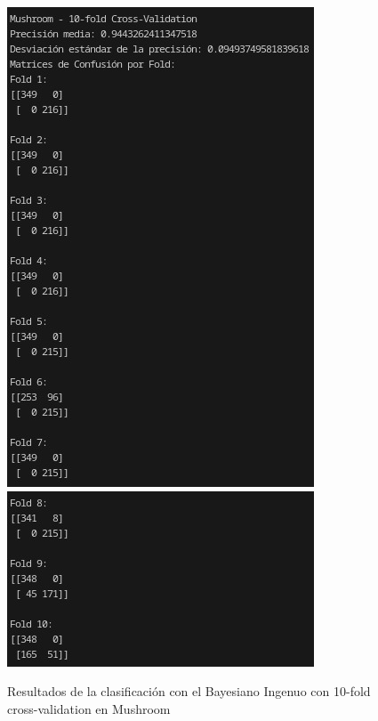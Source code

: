 \documentclass{article}
\begin{document}
    \begin{figure}[!h]
        \centering
        \includegraphics[scale=0.4]{10-fold-mushroom-1.jpg}
        \includegraphics[scale=0.6]{10-fold-mushroom-2.jpg}
        \caption{Resultados de la clasificación con el Bayesiano Ingenuo con 10-fold cross-validation en Mushroom}
    \end{figure}    
    
    
    
\end{document}
